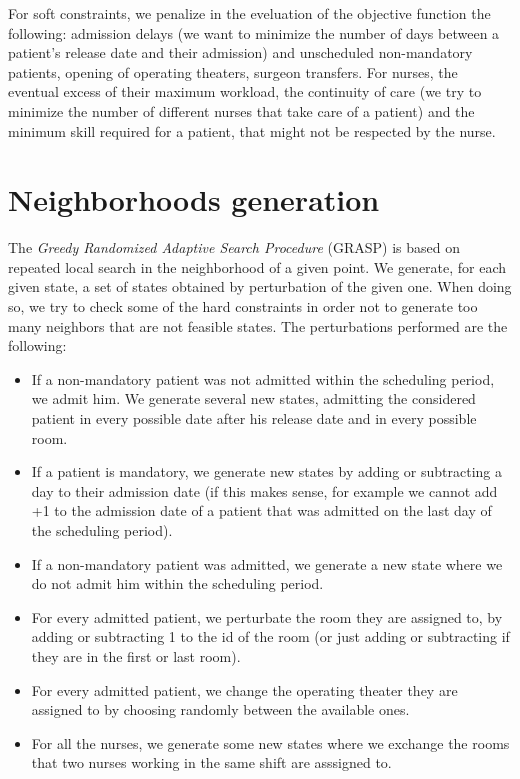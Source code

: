 \documentclass{article}
\begin{document}
For soft constraints, we penalize in the eveluation of the objective function the following: admission delays (we want to minimize the number of 
days between a patient's release date and their admission) and unscheduled non-mandatory patients, opening of operating theaters, surgeon transfers. 
For nurses, the eventual excess of their maximum workload, the continuity of care (we try to minimize the number of different nurses that take care of 
a patient) and the minimum skill required for a patient, that might not be respected by the nurse.

\section{Neighborhoods generation}
The \textit{Greedy Randomized Adaptive Search Procedure} (GRASP) is based on repeated local search in the neighborhood 
of a given point. We generate, for each given state, a set of states obtained by perturbation of the given one. When doing 
so, we try to check some of the hard constraints in order not to generate too many neighbors that are not feasible states.
The perturbations performed are the following:
\begin{itemize}
    \item If a non-mandatory patient was not admitted within the scheduling period, we admit him. We generate several new states, 
    admitting the considered patient in every possible date after his release date and in every possible room.
    \item If a patient is mandatory, we generate new states by adding or subtracting a day to their admission date (if this makes sense, for example 
    we cannot add +1 to the admission date of a patient that was admitted on the last day of the scheduling period).
    \item If a non-mandatory patient was admitted, we generate a new state where we do not admit him within the scheduling period.
    \item For every admitted patient, we perturbate the room they are assigned to, by adding or subtracting 1 to the id of the room (or just adding or 
    subtracting if they are in the first or last room).
    \item For every admitted patient, we change the operating theater they are assigned to by choosing randomly between the available ones.
    \item For all the nurses, we generate some new states where we exchange the rooms that two nurses working in the same shift are asssigned to.
\end{itemize}
\end{document}
